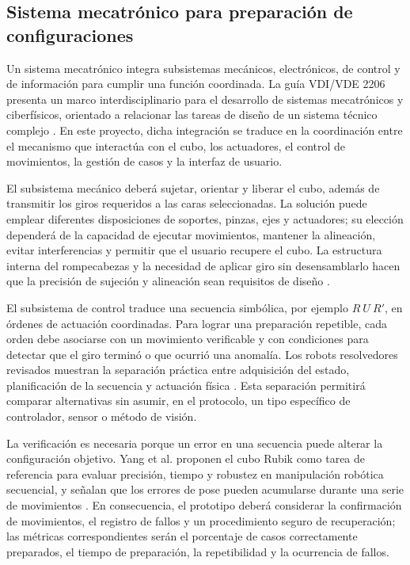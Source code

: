 \subsection{Sistema mecatrónico para preparación de configuraciones}

Un sistema mecatrónico integra subsistemas mecánicos, electrónicos, de control y de información para cumplir una función coordinada. La guía VDI/VDE 2206 presenta un marco interdisciplinario para el desarrollo de sistemas mecatrónicos y ciberfísicos, orientado a relacionar las tareas de diseño de un sistema técnico complejo \cite{VDI2206_2021}. En este proyecto, dicha integración se traduce en la coordinación entre el mecanismo que interactúa con el cubo, los actuadores, el control de movimientos, la gestión de casos y la interfaz de usuario.

El subsistema mecánico deberá sujetar, orientar y liberar el cubo, además de transmitir los giros requeridos a las caras seleccionadas. La solución puede emplear diferentes disposiciones de soportes, pinzas, ejes y actuadores; su elección dependerá de la capacidad de ejecutar movimientos, mantener la alineación, evitar interferencias y permitir que el usuario recupere el cubo. La estructura interna del rompecabezas y la necesidad de aplicar giro sin desensamblarlo hacen que la precisión de sujeción y alineación sean requisitos de diseño \cite{Zeng2018}.

El subsistema de control traduce una secuencia simbólica, por ejemplo $R\ U\ R'$, en órdenes de actuación coordinadas. Para lograr una preparación repetible, cada orden debe asociarse con un movimiento verificable y con condiciones para detectar que el giro terminó o que ocurrió una anomalía. Los robots resolvedores revisados muestran la separación práctica entre adquisición del estado, planificación de la secuencia y actuación física \cite{Novakova2018,Gorriz2023}. Esta separación permitirá comparar alternativas sin asumir, en el protocolo, un tipo específico de controlador, sensor o método de visión.

La verificación es necesaria porque un error en una secuencia puede alterar la configuración objetivo. Yang et al. proponen el cubo Rubik como tarea de referencia para evaluar precisión, tiempo y robustez en manipulación robótica secuencial, y señalan que los errores de pose pueden acumularse durante una serie de movimientos \cite{Yang2020}. En consecuencia, el prototipo deberá considerar la confirmación de movimientos, el registro de fallos y un procedimiento seguro de recuperación; las métricas correspondientes serán el porcentaje de casos correctamente preparados, el tiempo de preparación, la repetibilidad y la ocurrencia de fallos.


